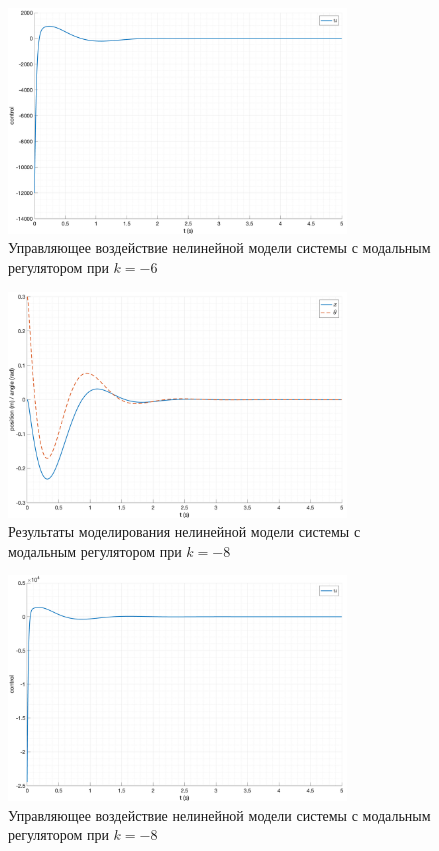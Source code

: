 \begin{figure}[ht!]
    \centering
    \includegraphics[width=0.8\textwidth]{media/plots/modal_controllers/u_2.png}
    \caption{Управляющее воздействие нелинейной модели системы с модальным регулятором при $k = -6$}
    \label{fig:modal_controlers_2_u}
\end{figure}
\begin{figure}[ht!]
    \centering
    \includegraphics[width=0.8\textwidth]{media/plots/modal_controllers/out_3.png}
    \caption{Результаты моделирования нелинейной модели системы с модальным регулятором при $k = -8$}
    \label{fig:modal_controlers_3_out}
\end{figure}
\begin{figure}[ht!]
    \centering
    \includegraphics[width=0.8\textwidth]{media/plots/modal_controllers/u_3.png}
    \caption{Управляющее воздействие нелинейной модели системы с модальным регулятором при $k = -8$}
    \label{fig:modal_controlers_3_u}
\end{figure}
